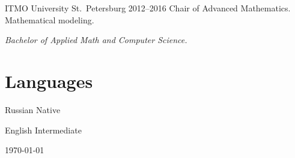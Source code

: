 \documentclass{cv}
\begin{document}
\begin{cvblock}{%
		\blocktitle
		{ITMO University}
		{St.~Petersburg}
		{}
		{2012--2016}}
	Chair of Advanced Mathematics. Mathematical modeling.
	\vspace{1em}

	\textit{Bachelor of Applied Math and Computer Science.}
\end{cvblock}

\section{Languages}

\begin{cvblock}{Russian}
	Native
\end{cvblock}

\begin{cvblock}{English}
	Intermediate
\end{cvblock}

\vfill
\begin{center}
	\monthyear\today
\end{center}
\end{document}

